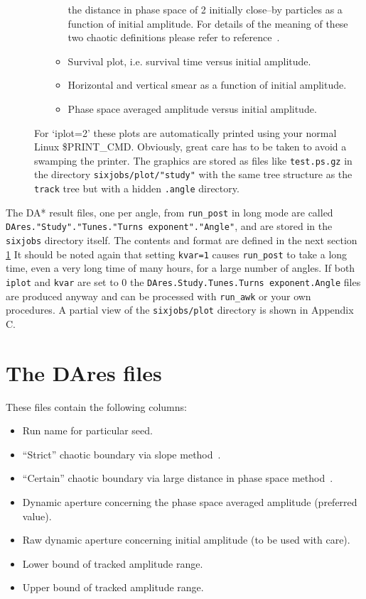 \documentclass{article}    %
\begin{document}
\begin{description}
\begin{itemize}
\begin{itemize}
      the distance in phase space of 2 initially close--by particles
      as a function of initial amplitude. For details of the meaning
      of these two chaotic definitions please refer to
      reference~\cite{LHC8}.
    \item Survival plot, i.e. survival time versus initial amplitude.
    \item Horizontal and vertical smear as a function of initial
      amplitude.
    \item Phase space averaged amplitude versus initial amplitude.
    \end{itemize}
  \end{itemize}
  For `iplot=2' these plots are automatically printed using
  your normal Linux \$PRINT\_CMD.
  Obviously, great care has to be taken to avoid a
  swamping the printer. The graphics are stored as files
  like {\tt test.ps.gz} in the directory  
  {\tt sixjobs/plot/"study"} with the same tree structure as the
  {\tt track} tree but with a hidden {\tt .angle} directory.
\end{description}

The DA* result files, one per angle, from {\tt run\_post} in long mode
are called {\tt DAres."Study"."Tunes."Turns exponent"."Angle"},
and are stored in the {\tt sixjobs} directory itself.
The contents and format are defined in the next section \ref{sec:DAres}
It should be noted again that setting {\tt kvar=1}
causes {\tt run\_post} to take a long time, even a very long time of
many hours, for a large number of angles. If both {\tt iplot} and
{\tt kvar} are set to 0 the {\tt DAres.Study.Tunes.Turns exponent.Angle}
files are produced anyway and can be processed with {\tt run\_awk} 
or your own procedures. A partial view of the {\tt sixjobs/plot} 
directory is shown in Appendix C.

\section{The DAres files}
\label{sec:DAres}
These files contain the following columns:
\begin{itemize}
\item Run name for particular seed.
\item ``Strict'' chaotic boundary via slope method~\cite{LHC8}.
\item ``Certain'' chaotic boundary via large distance in phase space
  method~\cite{LHC8}.
\item Dynamic aperture concerning the phase space averaged amplitude
  (preferred value).
\item Raw dynamic aperture concerning initial amplitude (to be used
  with care).
\item Lower bound of tracked amplitude range.
\item Upper bound of tracked amplitude range.
\end{itemize}
\end{document}
